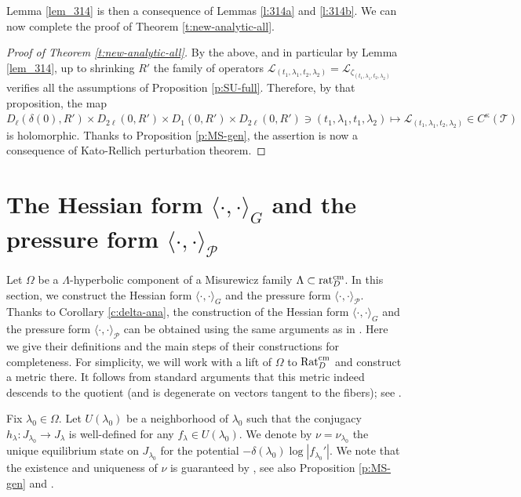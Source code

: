 \documentclass[11pt]{amsart}
\theoremstyle{plain}
\theoremstyle{definition}
\theoremstyle{remark}
\begin{document}
Lemma \ref{lem_314} is then a
consequence of Lemmas \ref{l:314a} and \ref{l:314b}.
We can now  complete the proof of
Theorem 
\ref{t:new-analytic-all}.

\begin{proof}[Proof of 
Theorem
\ref{t:new-analytic-all}]
By the above, and in particular by 
Lemma \ref{lem_314}, up to shrinking $R'$
the family of operators 
$\mathcal L_{(t_1,\lambda_1, t_2, \lambda_2)} 
= \mathcal L_{\zeta_{(t_1,\lambda_1, t_2, \lambda_2)}}$
verifies
all 
the assumptions of Proposition \ref{p:SU-full}. Therefore, by  that proposition,
the map 
$D_\ell (\delta (0) , R') \times  D_{2\ell} (0,R')
\times D_1 (0,R')\times D_{2\ell} (0,R')
\ni 
(t_1,\lambda_1, t_1, \lambda_2)
\mapsto \mathcal{L}_{(t_1,\lambda_1, t_2, \lambda_2)}\in %
C^{\kappa} (\mathcal T)$
is holomorphic. 
Thanks to Proposition \ref{p:MS-gen}, the assertion is now 
a consequence of Kato-Rellich perturbation theorem.
\end{proof}


\section{The Hessian form $\langle \cdot, \cdot \rangle_G$ and the pressure form $\langle \cdot, \cdot \rangle_{\mathcal{P}}$} \label{sec_4}
Let $\Omega$ be a $\Lambda$-hyperbolic component of a Misurewicz family $\Lambda \subset {\rm rat}_D^{\rm cm}$.
In this section, we construct the Hessian form $\langle \cdot, \cdot \rangle_G$ and the pressure form $\langle \cdot, \cdot \rangle_{\mathcal{P}}$. Thanks to
Corollary \ref{c:delta-ana}, the construction of the Hessian form $\langle \cdot, \cdot \rangle_G$ and the pressure form $\langle \cdot, \cdot \rangle_{\mathcal{P}}$ can be obtained using the same arguments as in \cite{HeNie23,BH24}. Here we give their definitions and the main steps of their constructions for completeness.
For simplicity, we will work with a lift of $\Omega$ to ${\rm Rat}_D^{\rm cm}$ and construct a metric there. It follows from standard arguments that this metric indeed descends to the quotient (and is degenerate on vectors tangent to the fibers); see \cite{HeNie23}.

\medskip

Fix $\lambda_0 \in \Omega$. Let $U(\lambda_0)$ be a neighborhood of $\lambda_0$
such that the conjugacy $h_\lambda \colon J_{\lambda_0} \to J_\lambda$
is well-defined for any $f_\lambda \in U(\lambda_0)$. 
We denote by 
$\nu= \nu_{\lambda_0}$
the unique
equilibrium state on $J_{\lambda_0}$ for the potential
$-\delta
(\lambda_0)\log |f_{\lambda_0}'|$. We note that the existence and uniqueness of $\nu$ is guaranteed by 
\cite{MakSmir03}, see also
Proposition \ref{p:MS-gen} and 
\cite{PRLS03}.
\end{document}
